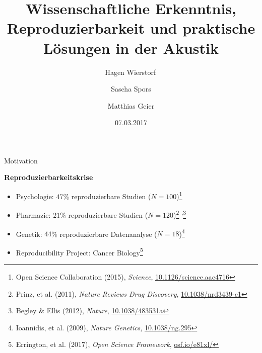 \documentclass{beamer}
\begin{document}
\title{Wissenschaftliche Erkenntnis, Reproduzierbarkeit und praktische Lösungen
in der Akustik}
\author{Hagen Wierstorf$\,$ \and
        Sascha Spors \and
        Matthias Geier}
\date{07.03.2017}
\maketitle

\begin{frame}{Motivation}

    \textbf{Reproduzierbarkeitskrise}

    \begin{itemize}
        \item Psychologie: $47$\% reproduzierbare Studien ($N=100$)\footnote{%
            Open Science Collaboration (2015), \emph{Science},
            \href{https://doi.org/10.1126/science.aac4716}{10.1126/science.aac4716}}
        \item Pharmazie: $21$\% reproduzierbare Studien ($N=120$)\footnote{%
            Prinz, et al. (2011), \emph{Nature Reviews Drug Discovery},
            \href{https://doi.org/10.1038/nrd3439-c1}{10.1038/nrd3439-c1}}%
            \textsuperscript{,}\footnote{%
            Begley \& Ellis (2012), \emph{Nature},
            \href{https://doi.org/10.1038/483531a}{10.1038/483531a}}
        \item Genetik: $44$\% reproduzierbare Datenanalyse ($N=18$)\footnote{%
            Ioannidis, et al. (2009), \emph{Nature Genetics},
            \href{https://doi.org/10.1038/ng.295}{10.1038/ng.295}}
    \end{itemize}

    \begin{itemize}
        \item Reproducibility Project: Cancer Biology\footnote{%
            Errington, et al. (2017), \emph{Open Science Framework},
            \href{https://osf.io/e81xl/}{osf.io/e81xl/}}
    \end{itemize}

\end{frame}
\end{document}
